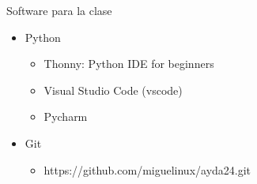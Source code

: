 \begin{frame}[c]{Software para la clase}
  \begin{itemize}
    \item Python
      \begin{itemize}
        \item Thonny: Python IDE for beginners
        \item Visual Studio Code (vscode)
        \item Pycharm
      \end{itemize}
    \item Git
      \begin{itemize}
        \item https://github.com/miguelinux/ayda24.git
      \end{itemize}
  \end{itemize}
\end{frame}
